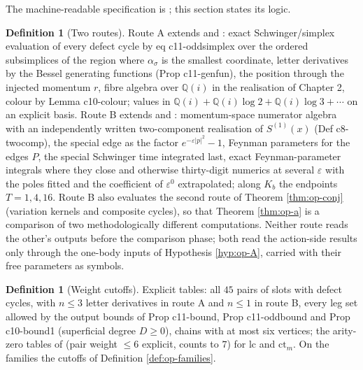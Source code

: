 \documentclass[11pt]{article}
\numberwithin{equation}{section}
\theoremstyle{plain}
\theoremstyle{definition}
\newtheorem{definition}[theorem]{Definition}
\newcommand{\lc}{\mathrm{lc}}
\newcommand{\ct}{\mathrm{ct}}
\begin{document}
The machine-readable specification is ; this section states its logic.

\begin{definition}[Two routes]
\label{def:op-routes}
Route A extends  and : exact Schwinger/simplex evaluation of every defect cycle by eq c11-oddsimplex over the ordered subsimplices of the region where $\alpha_\sigma$ is the smallest coordinate, letter derivatives by the Bessel generating functions (Prop c11-genfun), the position through the injected momentum $r$, fibre algebra over $\mathbb Q(i)$ in the realisation of Chapter 2, colour by Lemma c10-colour; values in $\mathbb Q(i)+\mathbb Q(i)\log2+\mathbb Q(i)\log3+\cdots$ on an explicit basis. Route B extends  and : momentum-space numerator algebra with an independently written two-component realisation of $S^{(1)}(x)$ (Def c8-twocomp), the special edge as the factor $e^{-\varepsilon|p|^2}-1$, Feynman parameters for the edges $P$, the special Schwinger time integrated last, exact Feynman-parameter integrals where they close and otherwise thirty-digit numerics at several $\varepsilon$ with the poles fitted and the coefficient of $\varepsilon^0$ extrapolated; along $K_b$ the endpoints $T=1,4,16$. Route B also evaluates the second route of Theorem \ref{thm:op-conj} (variation kernels and composite cycles), so that Theorem \ref{thm:op-a} is a comparison of two methodologically different computations. Neither route reads the other's outputs before the comparison phase; both read the action-side results only through the one-body inputs of Hypothesis \ref{hyp:op-A}, carried with their free parameters as symbols.
\end{definition}

\begin{definition}[Weight cutoffs]
\label{def:op-cutoffs}
Explicit tables: all $45$ pairs of slots with defect cycles, with $n\le3$ letter derivatives in route A and $n\le1$ in route B, every leg set allowed by the output bounds of Prop c11-bound, Prop c11-oddbound and Prop c10-bound1 (superficial degree $D\ge0$), chains with at most six vertices; the arity-zero tables of  (pair weight $\le6$ explicit, counts to $7$) for $\lc$ and $\ct_m$. On the families the cutoffs of Definition \ref{def:op-families}.
\end{definition}
\end{document}
